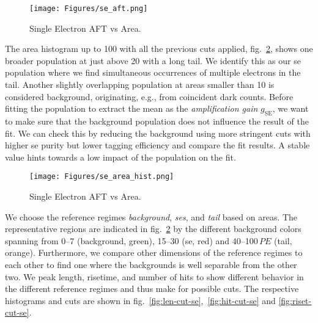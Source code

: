 \begin{figure}
    \centering
    \texttt{[image: Figures/se\_aft.png]}  %
    \caption[AFT vs Area Single Electrons]{
        Single Electron AFT vs Area.
    }
    \label{fig:se-aft}
\end{figure}

The area histogram up to \SI{100}{} with all the previous cuts applied, fig.~\ref{fig:se-area-hist}, shows one broader population at just above \SI{20}{} with a long tail.
We identify this as our \gls{se} population where we find simultaneous occurrences of multiple electrons in the tail.
Another slightly overlapping population at areas smaller than \SI{10}{} is considered background, originating, e.g., from coincident dark counts.
Before fitting the population to extract the mean as the \emph{amplification gain} $ g_\mathrm{SE} $, we want to make sure that the background population does not influence the result of the fit.
We can check this by reducing the background using more stringent cuts with higher \gls{se} purity but lower tagging efficiency and compare the fit results.
A stable value hints towards a low impact of the population on the fit.

\begin{figure}
    \centering
    \texttt{[image: Figures/se\_area\_hist.png]}  %
    \caption[Histogram Area Single Electrons and Background]{
        Single Electron AFT vs Area.
    }
    \label{fig:se-area-hist}
\end{figure}


We choose the reference regimes \emph{background}, \emph{\glspl{se}}, and \emph{tail} based on areas.
The representative regions are indicated in fig.~\ref{fig:se-area-hist} by the different background colors spanning from \numrange{0}{7} (background, green), \numrange{15}{30} (\gls{se}, red) and \numrange{40}{100}$ \,\mathit{PE} $ (tail, orange).
Furthermore, we compare other dimensions of the reference regimes to each other to find one where the backgrounds is well separable from the other two.
We peak length, risetime, and number of hits to show different behavior in the different reference regimes and thus make for possible cuts.
The respective histograms and cuts are shown in fig.~\ref{fig:len-cut-se},~\ref{fig:hit-cut-se} and \ref{fig:riset-cut-se}.






